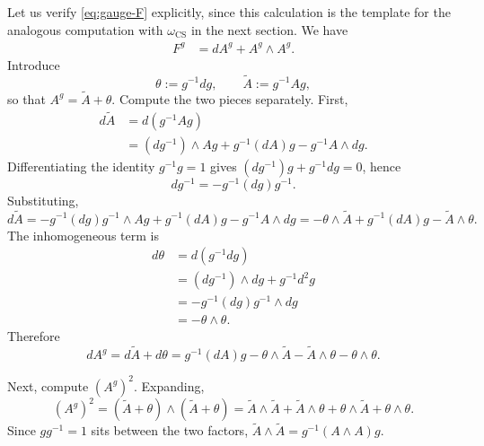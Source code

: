 \documentclass[11pt]{article}
\newcommand{\CS}{\operatorname{CS}}
\theoremstyle{definition}
\numberwithin{theorem}{section}
\numberwithin{equation}{section}
\begin{document}
\noindent Let us verify \eqref{eq:gauge-F} explicitly, since this calculation is the template for the analogous computation with $\omega_{\CS}$ in the next section. We have
\begin{align*}
F^g &= dA^g + A^g\wedge A^g.
\end{align*}
Introduce
\begin{equation*}
\theta := g^{-1}dg,
\qquad
\tilde A := g^{-1}Ag,
\end{equation*}
so that $A^g = \tilde A + \theta$. Compute the two pieces separately. First,
\begin{align*}
 d\tilde A
 &= d(g^{-1}Ag) \\
 &= (dg^{-1})\wedge Ag + g^{-1}(dA)g - g^{-1}A\wedge dg.
\end{align*}
Differentiating the identity $g^{-1}g = 1$ gives $(dg^{-1})g + g^{-1}dg = 0$, hence
\begin{equation}\label{eq:dginv}
dg^{-1} = -g^{-1}(dg)g^{-1}.
\end{equation}
Substituting,
\begin{equation*}
 d\tilde A = -g^{-1}(dg)g^{-1}\wedge Ag + g^{-1}(dA)g - g^{-1}A\wedge dg = -\theta\wedge\tilde A + g^{-1}(dA)g - \tilde A\wedge\theta.
\end{equation*}
\noindent The inhomogeneous term is
\begin{equation*}
\begin{aligned}
d\theta
&= d(g^{-1}dg) \\
&= (dg^{-1})\wedge dg + g^{-1}d^2g \\
&= -g^{-1}(dg)g^{-1}\wedge dg \\
&= -\theta\wedge\theta.
\end{aligned}
\end{equation*}
\noindent Therefore
\begin{equation*}
dA^g = d\tilde A + d\theta = g^{-1}(dA)g - \theta\wedge\tilde A - \tilde A\wedge\theta - \theta\wedge\theta.
\end{equation*}

\medskip

\noindent Next, compute $(A^g)^2$. Expanding,
\begin{equation*}
(A^g)^2 = (\tilde A+\theta)\wedge(\tilde A+\theta) = \tilde A\wedge\tilde A + \tilde A\wedge\theta + \theta\wedge\tilde A + \theta\wedge\theta.
\end{equation*}
Since $gg^{-1}=1$ sits between the two factors, $\tilde A\wedge\tilde A = g^{-1}(A\wedge A)g$.

\medskip
\end{document}
